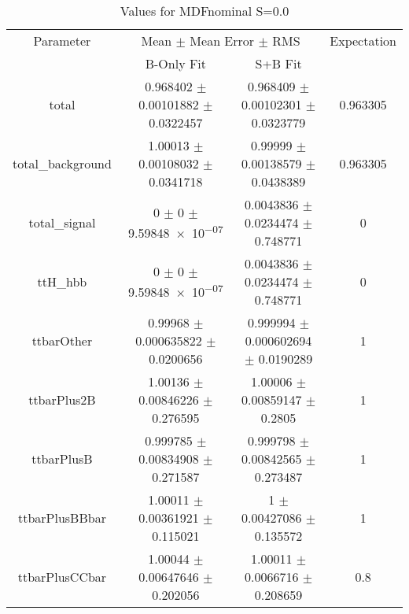 \begin{table}
\centering
\caption{Values for MDFnominal S=0.0}
\begin{tabular}{cccc}
\toprule
Parameter & \multicolumn{2}{c}{Mean $\pm$ Mean Error $\pm$ RMS} & Expectation\\
 & B-Only Fit & S+B Fit & \\
\midrule
total & \num{0.968402} $\pm$ \num{0.00101882} $\pm$ \num{0.0322457} & \num{0.968409} $\pm$ \num{0.00102301} $\pm$ \num{0.0323779} & \num{0.963305}\\
total\_background & \num{1.00013} $\pm$ \num{0.00108032} $\pm$ \num{0.0341718} & \num{0.99999} $\pm$ \num{0.00138579} $\pm$ \num{0.0438389} & \num{0.963305}\\
total\_signal & \num{0} $\pm$ \num{0} $\pm$ \num{9.59848e-07} & \num{0.0043836} $\pm$ \num{0.0234474} $\pm$ \num{0.748771} & \num{0}\\
ttH\_hbb & \num{0} $\pm$ \num{0} $\pm$ \num{9.59848e-07} & \num{0.0043836} $\pm$ \num{0.0234474} $\pm$ \num{0.748771} & \num{0}\\
ttbarOther & \num{0.99968} $\pm$ \num{0.000635822} $\pm$ \num{0.0200656} & \num{0.999994} $\pm$ \num{0.000602694} $\pm$ \num{0.0190289} & \num{1}\\
ttbarPlus2B & \num{1.00136} $\pm$ \num{0.00846226} $\pm$ \num{0.276595} & \num{1.00006} $\pm$ \num{0.00859147} $\pm$ \num{0.2805} & \num{1}\\
ttbarPlusB & \num{0.999785} $\pm$ \num{0.00834908} $\pm$ \num{0.271587} & \num{0.999798} $\pm$ \num{0.00842565} $\pm$ \num{0.273487} & \num{1}\\
ttbarPlusBBbar & \num{1.00011} $\pm$ \num{0.00361921} $\pm$ \num{0.115021} & \num{1} $\pm$ \num{0.00427086} $\pm$ \num{0.135572} & \num{1}\\
ttbarPlusCCbar & \num{1.00044} $\pm$ \num{0.00647646} $\pm$ \num{0.202056} & \num{1.00011} $\pm$ \num{0.0066716} $\pm$ \num{0.208659} & \num{0.8}\\
\bottomrule
\end{tabular}
\end{table}